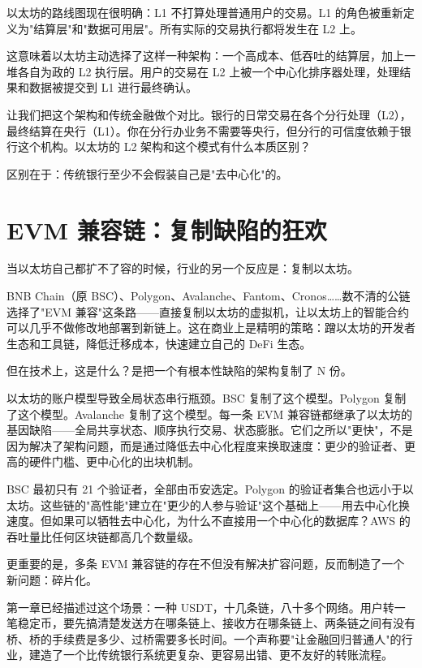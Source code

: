 \documentclass[a4paper,12pt,openany]{ctexbook}
\begin{document}
以太坊的路线图现在很明确：L1 不打算处理普通用户的交易。L1 的角色被重新定义为"结算层"和"数据可用层"。所有实际的交易执行都将发生在 L2 上。

这意味着以太坊主动选择了这样一种架构：一个高成本、低吞吐的结算层，加上一堆各自为政的 L2 执行层。用户的交易在 L2 上被一个中心化排序器处理，处理结果和数据被提交到 L1 进行最终确认。

让我们把这个架构和传统金融做个对比。银行的日常交易在各个分行处理（L2），最终结算在央行（L1）。你在分行办业务不需要等央行，但分行的可信度依赖于银行这个机构。以太坊的 L2 架构和这个模式有什么本质区别？

区别在于：传统银行至少不会假装自己是"去中心化"的。


\section*{EVM 兼容链：复制缺陷的狂欢}


当以太坊自己都扩不了容的时候，行业的另一个反应是：复制以太坊。

BNB Chain（原 BSC）、Polygon、Avalanche、Fantom、Cronos……数不清的公链选择了"EVM 兼容"这条路——直接复制以太坊的虚拟机，让以太坊上的智能合约可以几乎不做修改地部署到新链上。这在商业上是精明的策略：蹭以太坊的开发者生态和工具链，降低迁移成本，快速建立自己的 DeFi 生态。

但在技术上，这是什么？是把一个有根本性缺陷的架构复制了 N 份。

以太坊的账户模型导致全局状态串行瓶颈。BSC 复制了这个模型。Polygon 复制了这个模型。Avalanche 复制了这个模型。每一条 EVM 兼容链都继承了以太坊的基因缺陷——全局共享状态、顺序执行交易、状态膨胀。它们之所以"更快"，不是因为解决了架构问题，而是通过降低去中心化程度来换取速度：更少的验证者、更高的硬件门槛、更中心化的出块机制。

BSC 最初只有 21 个验证者，全部由币安选定。Polygon 的验证者集合也远小于以太坊。这些链的"高性能"建立在"更少的人参与验证"这个基础上——用去中心化换速度。但如果可以牺牲去中心化，为什么不直接用一个中心化的数据库？AWS 的吞吐量比任何区块链都高几个数量级。

更重要的是，多条 EVM 兼容链的存在不但没有解决扩容问题，反而制造了一个新问题：碎片化。

第一章已经描述过这个场景：一种 USDT，十几条链，八十多个网络。用户转一笔稳定币，要先搞清楚发送方在哪条链上、接收方在哪条链上、两条链之间有没有桥、桥的手续费是多少、过桥需要多长时间。一个声称要"让金融回归普通人"的行业，建造了一个比传统银行系统更复杂、更容易出错、更不友好的转账流程。
\end{document}
